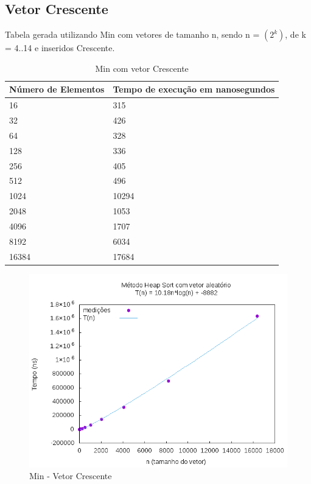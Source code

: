 \documentclass[12pt,a4paper,twoside]{report}
\begin{document}
\subsection{Vetor Crescente}
Tabela gerada utilizando Min com vetores de tamanho n, sendo n = $(2^k)$, de k = 4..14 e inseridos Crescente.
\begin{table}[H]
\centering
\caption{Min com vetor Crescente}
\label{my-label}
\begin{tabular}{|l|l|}
\hline
\multicolumn{1}{|c|}{\textbf{Número de Elementos}} & \multicolumn{1}{c|}{\textbf{Tempo de execução em nanosegundos}} \\ \hline
16 & 315 \\ \hline
32 & 426 \\ \hline
64 & 328 \\ \hline
128 & 336 \\ \hline
256 & 405 \\ \hline
512 & 496 \\ \hline
1024 & 10294 \\ \hline
2048 & 1053 \\ \hline
4096 & 1707 \\ \hline
8192 & 6034 \\ \hline
16384 & 17684 \\ \hline

\end{tabular}
\end{table}

\begin{figure}[H]
    \centering
    \includegraphics[width=0.7\linewidth]{graficos/HeapSort/vIntAleatorio/vIntAleatorio.png}
  \caption{Min - Vetor Crescente}
\end{figure}
\end{document}
